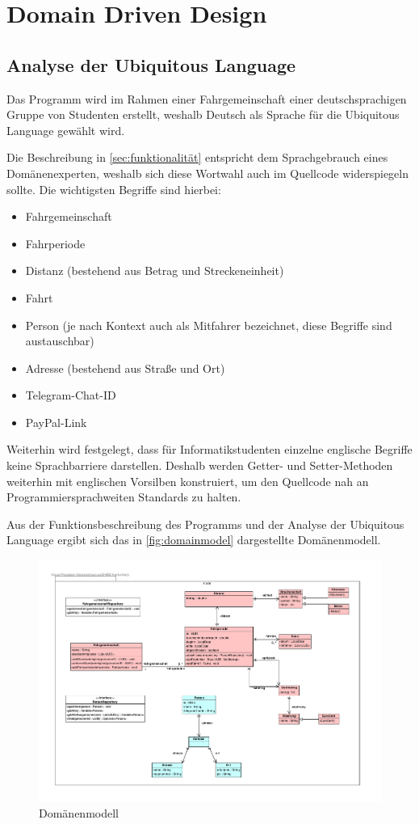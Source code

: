 \chapter{Domain Driven Design}
\section{Analyse der Ubiquitous Language}
Das Programm wird im Rahmen einer Fahrgemeinschaft einer deutschsprachigen Gruppe von Studenten erstellt, weshalb Deutsch als Sprache für die Ubiquitous Language gewählt wird.

Die Beschreibung in \autoref{sec:funktionalität} entspricht dem Sprachgebrauch eines Domänenexperten, weshalb sich diese Wortwahl auch im Quellcode widerspiegeln sollte.
Die wichtigsten Begriffe sind hierbei:

\begin{itemize}
    \item Fahrgemeinschaft
    \item Fahrperiode
    \item Distanz (bestehend aus Betrag und Streckeneinheit)
    \item Fahrt
    \item Person (je nach Kontext auch als Mitfahrer bezeichnet, diese Begriffe sind austauschbar)
    \item Adresse (bestehend aus Straße und Ort)
    \item Telegram-Chat-ID
    \item PayPal-Link
\end{itemize}

Weiterhin wird festgelegt, dass für Informatikstudenten einzelne englische Begriffe keine Sprachbarriere darstellen.
Deshalb werden Getter- und Setter-Methoden weiterhin mit englischen Vorsilben konstruiert, um den Quellcode nah an Programmiersprachweiten Standards zu halten.

Aus der Funktionsbeschreibung des Programms und der Analyse der Ubiquitous Language ergibt sich das in \autoref{fig:domainmodel} dargestellte Domänenmodell.

\begin{figure}
    \centering
    \includegraphics[width=1\textwidth, trim = 0cm 0cm 0cm 0cm]{../VPP/Domain Modell.pdf}
    \caption{Domänenmodell}
    \label{fig:domainmodel}
\end{figure}

